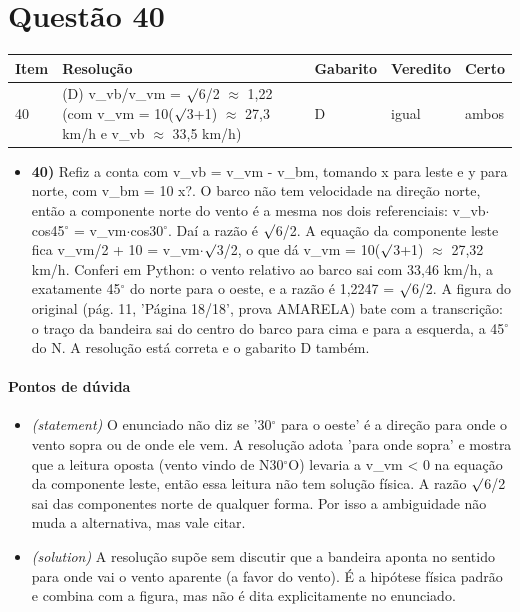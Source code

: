 \documentclass{article}%
\begin{document}
\section*{Questão 40}%
\begin{longtable}{@{}p{} p{} p{} p{} p{}@{}}\toprule Item & Resolução & Gabarito & Veredito & Certo \\ \midrule
40 & (D) v\_vb/v\_vm = $\surd$6/2 $\approx$ 1,22 (com v\_vm = 10($\surd$3+1) $\approx$ 27,3 km/h e v\_vb $\approx$ 33,5 km/h) & D & igual & ambos \\
\bottomrule\end{longtable}%
\begin{itemize}%
\item%
\textbf{40)} Refiz a conta com v\_vb = v\_vm - v\_bm, tomando x para leste e y para norte, com v\_bm = 10 x?. O barco não tem velocidade na direção norte, então a componente norte do vento é a mesma nos dois referenciais: v\_vb$\cdot$cos45$^\circ$ = v\_vm$\cdot$cos30$^\circ$. Daí a razão é $\surd$6/2. A equação da componente leste fica v\_vm/2 + 10 = v\_vm$\cdot$$\surd$3/2, o que dá v\_vm = 10($\surd$3+1) $\approx$ 27,32 km/h. Conferi em Python: o vento relativo ao barco sai com 33,46 km/h, a exatamente 45$^\circ$ do norte para o oeste, e a razão é 1,2247 = $\surd$6/2. A figura do original (pág. 11, 'Página 18/18', prova AMARELA) bate com a transcrição: o traço da bandeira sai do centro do barco para cima e para a esquerda, a 45$^\circ$ do N. A resolução está correta e o gabarito D também.%
\end{itemize}%
\paragraph{Pontos de dúvida}%
\begin{itemize}%
\item%
\textit{(statement)} O enunciado não diz se '30$^\circ$ para o oeste' é a direção para onde o vento sopra ou de onde ele vem. A resolução adota 'para onde sopra' e mostra que a leitura oposta (vento vindo de N30$^\circ$O) levaria a v\_vm < 0 na equação da componente leste, então essa leitura não tem solução física. A razão $\surd$6/2 sai das componentes norte de qualquer forma. Por isso a ambiguidade não muda a alternativa, mas vale citar.%
\item%
\textit{(solution)} A resolução supõe sem discutir que a bandeira aponta no sentido para onde vai o vento aparente (a favor do vento). É a hipótese física padrão e combina com a figura, mas não é dita explicitamente no enunciado.%
\end{itemize}%
\end{document}
